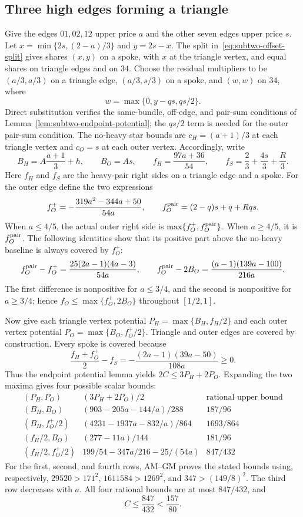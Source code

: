 \documentclass[11pt]{article}
\theoremstyle{definition}\newtheorem{algorithm}{Algorithm}[section]
\numberwithin{equation}{section}
\theoremstyle{remark}\newtheorem*{remark}{Remark}
\begin{document}
\subsection{Three high edges forming a triangle}\label{app:subtwo-high-triangle}
Give the edges $01,02,12$ upper price $a$ and the other seven
edges upper price $s$.
Let $x=\min\{2s,(2-a)/3\}$ and $y=2s-x$.  The split in~\eqref{eq:subtwo-offset-split} gives shares $(x,y)$
on a spoke, with $x$ at the triangle vertex, and equal shares on
triangle edges and on $34$.  Choose the residual multipliers to be
$(a/3,a/3)$ on a triangle edge, $(a/3,s/3)$ on a spoke, and
$(w,w)$ on $34$, where
\[
                 w=\max\{0,y-qs,qs/2\}.
\]
Direct substitution verifies the same-bundle, off-edge, and pair-sum
conditions of Lemma~\ref{lem:subtwo-endpoint-potential}; the $qs/2$
term is needed for the outer pair-sum condition.  The no-heavy
star bounds are $c_H=(a+1)/3$ at each triangle vertex and $c_O=s$
at each outer vertex.  Accordingly, write
\[
 B_H=A\frac{a+1}{3}+h,\qquad B_O=As,\qquad
 f_H=\frac{97a+36}{54},\qquad
 f_S=\frac23+\frac{4s}{3}+\frac R3.
\]
Here $f_H$ and $f_S$ are the heavy-pair right sides on a triangle
edge and a spoke.  For the outer edge define the two expressions
\[
 f_O^+=-\frac{319a^2-344a+50}{54a},\qquad
 f_O^{\rm pair}=(2-q)s+q+Rqs.
\]
When $a\leq4/5$, the actual outer right side is
$\max\{f_O^+,f_O^{\rm pair}\}$.  When $a\geq4/5$, it is
$f_O^{\rm pair}$.  The following identities show that its positive
part above the no-heavy baseline is always covered by $f_O^+$:
\[
 f_O^{\rm pair}-f_O^+
       =\frac{25(2a-1)(4a-3)}{54a},\qquad
 f_O^{\rm pair}-2B_O
       =\frac{(a-1)(139a-100)}{216a}.
\]
The first difference is nonpositive for $a\leq3/4$, and the
second is nonpositive for $a\geq3/4$; hence
$f_O\leq\max\{f_O^+,2B_O\}$ throughout $[1/2,1]$.

Now give each triangle vertex potential
$P_H=\max\{B_H,f_H/2\}$ and each outer vertex potential
$P_O=\max\{B_O,f_O^+/2\}$.  Triangle and outer edges are covered
by construction.  Every spoke is covered because
\[
 \frac{f_H+f_O^+}{2}-f_S
       =-\frac{(2a-1)(39a-50)}{108a}\geq0.
\]
Thus the endpoint potential lemma yields $2C\leq3P_H+2P_O$.
Expanding the two maxima gives four possible scalar bounds:
\[
\begin{array}{c|c|c}
 (P_H,P_O)&(3P_H+2P_O)/2&\text{rational upper bound}\\ \hline
 (B_H,B_O)&(903-205a-144/a)/288&187/96\\
 (B_H,f_O^+/2)&(4231-1937a-832/a)/864&1693/864\\
 (f_H/2,B_O)&(277-11a)/144&181/96\\
 (f_H/2,f_O^+/2)&199/54-347a/216-25/(54a)&847/432
\end{array}
\]
For the first, second, and fourth rows, AM--GM proves the stated
bounds using, respectively,
$29520>171^2$, $1611584>1269^2$, and
$347>(149/8)^2$.  The third row decreases with $a$.
All four rational bounds are at most $847/432$, and
\[
                   C\leq\frac{847}{432}
                         <\frac{157}{80}.
\]
\end{document}
